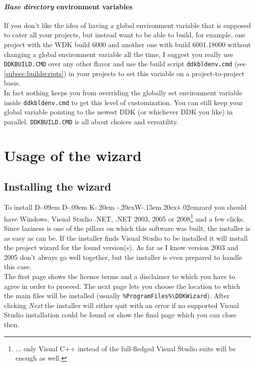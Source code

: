\documentclass[a4paper,titlepage]{report}
\def\ddkwiz{D\kern-.09em D\kern-.09em K\kern-.20em \raise-.20ex\hbox{W}\kern-.15em\raise.20ex\hbox{\it{i}}\kern-.02em{zard}}
\begin{document}
\subsubsection{\emph{Base directory} environment variables}
\label{subsubsec:basedir}
If you don't like the idea of having a global environment variable that is supposed to cater all your
projects, but instead want to be able to build, for example, one project with the WDK build 6000 and
another one with build 6001.18000 without changing a global environment variable all the time, I suggest
you really use \texttt{DDKBUILD.CMD} over any other flavor and use the build script \texttt{ddkbldenv.cmd}
(see \autoref{subsec:buildscripts}) in your projects to set this variable on a project-to-project basis.\\
In fact nothing keeps you from overriding the globally set environment variable inside \texttt{ddkbldenv.cmd}
to get this level of customization. You can still keep your global variable pointing to the newest DDK (or
whichever DDK you like) in parallel. \texttt{DDKBUILD.CMD} is all about choices and versatility.

\chapter{Usage of the wizard}\thispagestyle{fancy}
\section{Installing the wizard}
To install \ddkwiz{} you should have Windows, Visual Studio .NET, .NET 2003, 2005 or
2008\footnote{... only
Visual C++ instead of the full-fledged Visual Studio suite will be enough as well.}
and a few clicks. Since laziness is one of
the pillars on which this software was built, the installer is as easy as can be.
If the installer finds Visual Studio to be installed it will install the
project wizard for the found version(s). As far as I know version 2003 and 2005
don't always go well together, but the installer is even prepared to handle this case.\\

The first page shows the license terms and a disclaimer to which you have to agree
in order to proceed. The next page lets you choose the location to which the
main files will be installed (usually \verb+%ProgramFiles%\DDKWizard+). After
clicking \emph{Next} the installer will either quit with an error if no supported
Visual Studio installation could be found or show the final page which you can
close then.\\
\end{document}
